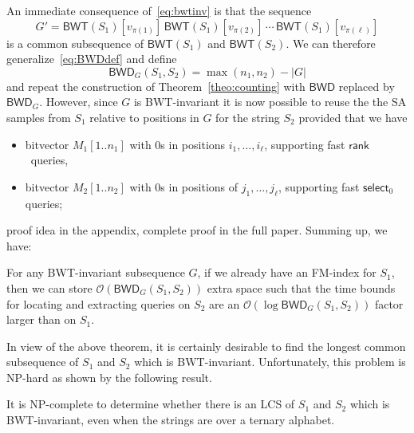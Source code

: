 \documentclass{llncs}
\newcommand{\Oh}[1]
  {\ensuremath{\mathcal{O}\!\left( {#1} \right)}}
\newcommand{\BWD}
  {\ensuremath{\mathsf{BWD}}}
\newcommand{\BWT}
  {\ensuremath{\mathsf{BWT}}}
\newcommand{\rank}
  {\ensuremath{\mathsf{rank}}}
\newcommand{\select}
  {\ensuremath{\mathsf{select}}}
\begin{document}


An immediate consequence of~\eqref{eq:bwtinv} is that the sequence
$$
G' = \BWT(S_1)[v_{\pi(1)}]\,\BWT(S_1)[v_{\pi(2)}]\,\cdots\,\BWT(S_1)[v_{\pi(\ell)}]
$$
is a common subsequence of $\BWT(S_1)$ and $\BWT(S_2)$. We can therefore
generalize~\eqref{eq:BWDdef} and define
$$
\BWD_G(S_1, S_2) = \max(n_1,n_2) - |G|
$$
and repeat the construction of Theorem~\ref{theo:counting} with $\BWD$
replaced by $\BWD_G$. However, since $G$ is BWT-invariant it is now possible
to reuse the the SA samples from $S_1$ relative to positions in $G$ for the
string $S_2$ provided that we have
\begin{itemize}
\item bitvector \(M_1 [1..n_1]\) with 0s in positions  $i_1, \ldots, i_\ell$,
    supporting fast \rank\ queries,
\item bitvector \(M_2 [1..n_2]\) with 0s in positions of $j_1, \ldots,
    j_\ell$, supporting fast $\select_0$ queries;
\end{itemize}
proof idea in the appendix, complete proof in the full paper. Summing up,
we have:

\begin{theorem} \label{theo:locating}
For any BWT-invariant subsequence $G$, if we already have an FM-index for
$S_1$, then we can store $\Oh{\BWD_G (S_1, S_2)}$ extra space such that the
time bounds for locating and extracting queries on $S_2$ are an $\Oh{\log
\BWD_G (S_1, S_2)}$ factor larger than on $S_1$.
\end{theorem}


In view of the above theorem, it is certainly desirable to find the longest
common subsequence of $S_1$ and $S_2$ which is BWT-invariant. Unfortunately,
this problem is NP-hard as shown by the following result.


\begin{theorem}\label{theo:np}
It is NP-complete to determine whether there is an LCS of $S_1$ and $S_2$
which is BWT-invariant, even when the strings are over a ternary alphabet.
\end{theorem}
\end{document}
